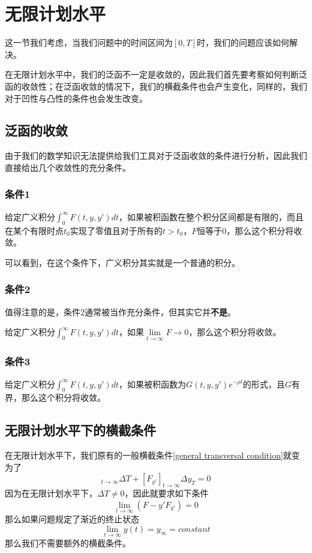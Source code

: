 \documentclass[UTF8,12pt]{ctexart}
\numberwithin{equation}{section} %
\numberwithin{figure}{section}
\numberwithin{table}{section}
\begin{document}
	\section{无限计划水平}
	这一节我们考虑，当我们问题中的时间区间为$[0,T]$时，我们的问题应该如何解决。
	
	在无限计划水平中，我们的泛函不一定是收敛的，因此我们首先要考察如何判断泛函的收敛性；在泛函收敛的情况下，我们的横截条件也会产生变化，同样的，我们对于凹性与凸性的条件也会发生改变。
	
	\subsection{泛函的收敛}
	由于我们的数学知识无法提供给我们工具对于泛函收敛的条件进行分析，因此我们直接给出几个收敛性的充分条件。
	
	\subsubsection{条件1}
	给定广义积分$\int_{0}^{\infty}F(t,y,y')dt$，如果被积函数在整个积分区间都是有限的，而且在某个有限时点$t_0$实现了零值且对于所有的$t > t_0$，$F$恒等于0，那么这个积分将收敛。
	
	可以看到，在这个条件下，广义积分其实就是一个普通的积分。
	
	
	\subsubsection{条件2}
	值得注意的是，条件2通常被当作充分条件，但其实它并\textbf{不是}。
	
	给定广义积分$\int_{0}^{\infty}F(t,y,y')dt$，如果$\lim\limits_{t \to \infty}F \to 0$，那么这个积分将收敛。
	
	\subsubsection{条件3}
	给定广义积分$\int_{0}^{\infty}F(t,y,y')dt$，如果被积函数为$G(t,y,y')e^{-\rho t}$的形式，且$G$有界，那么这个积分将收敛。
	
	\subsection{无限计划水平下的横截条件}
	在无限计划水平下，我们原有的一般横截条件\ref{general transversal condition}就变为了
	\begin{equation}
		[F-y'F_{y'}]_{t \to \infty}\Delta T + [F_{y'}]_{t \to \infty}\Delta y_T = 0
	\end{equation}
	因为在无限计划水平下，$\Delta T \neq 0$，因此就要求如下条件
	\begin{equation}
		\lim\limits_{t \to \infty}(F-y'F_{y'}) = 0
	\end{equation}
	那么如果问题规定了渐近的终止状态
	\begin{equation}
		\lim\limits_{t \to \infty}y(t) = y_{\infty} = constant
	\end{equation}
	那么我们不需要额外的横截条件。
	
\end{document}
